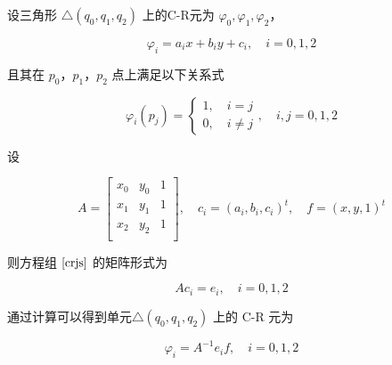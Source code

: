 \documentclass[a4paper,UTF8,titlepage]{ctexart}
\begin{document}
设三角形 $\bigtriangleup(q_0,q_1,q_2)$ 上的C-R元为 $\varphi_0, \varphi_1,\varphi_2$，

$$
\varphi_i = a_i x + b_i y + c_i, \quad i = 0,1,2
$$

且其在 $p_0$，$p_1$，$p_2$ 点上满足以下关系式

\begin{equation}
\varphi_i(p_j) = \begin{cases}
	1, \quad i = j \\
	0, \quad i \ne j	
\end{cases}, \quad i, j = 0,1,2
\label{crjs}
\end{equation}

设

$$
A = \begin{bmatrix}
	x_0 & y_0 &1 \\
	x_1 & y_1 &1 \\
	x_2 & y_2 &1 \\
\end{bmatrix}, \quad 
c_i = (a_i,b_i,c_i)^t , \quad
f = (x,y,1)^t
$$

则方程组 $\eqref{crjs}$ 的矩阵形式为

$$
A c_i = e_i, \quad i = 0,1,2
$$

通过计算可以得到单元$\bigtriangleup(q_0, q_1, q_2)$ 上的 C-R 元为

$$
\varphi_i = A^{-1} e_i f, \quad i = 0,1,2
$$ 

\end{document}
